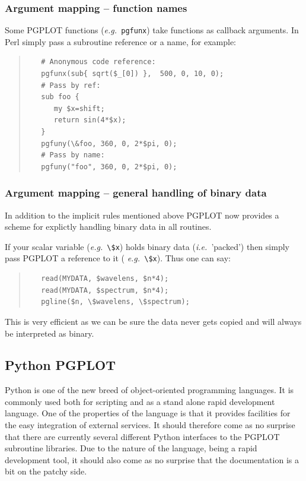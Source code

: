\documentclass[twoside,11pt]{article}
\newcommand{\htmladdnormallink}[2]{#1}
\newcommand{\xlabel}[1]{}
\begin{document}
\subsubsection{Argument mapping -- function names}

Some PGPLOT functions ({\em e.g.\ }{\tt pgfunx}) take functions as
callback arguments. In Perl simply pass a subroutine reference or a
name, for example:

\small
\begin{quote}
\begin{verbatim}
   # Anonymous code reference:
   pgfunx(sub{ sqrt($_[0]) },  500, 0, 10, 0);
   # Pass by ref:
   sub foo {
      my $x=shift;
      return sin(4*$x);
   }
   pgfuny(\&foo, 360, 0, 2*$pi, 0);
   # Pass by name:
   pgfuny("foo", 360, 0, 2*$pi, 0);
\end{verbatim}
\end{quote}
\normalsize

\subsubsection{Argument mapping -- general handling of binary data}

In addition to the implicit rules mentioned above PGPLOT now provides
a scheme for explictly handling binary data in all routines.

If your scalar variable ({\em e.g.\ }\verb+\$x+) holds binary data
({\em i.e.\ }'packed') then simply pass PGPLOT a reference to it ({\em
e.g.\ }\verb+\$x+). Thus one can say:

\small
\begin{quote}
\begin{verbatim}
   read(MYDATA, $wavelens, $n*4);
   read(MYDATA, $spectrum, $n*4);
   pgline($n, \$wavelens, \$spectrum);
\end{verbatim}
\end{quote}
\normalsize

This is very efficient as we can be sure the data never gets copied
and will always be interpreted as binary.

\subsection{\xlabel{sc15_pgpython}Python PGPLOT\label{sc15_pgpython}}

Python is one of the new breed of object-oriented programming
languages. It is commonly used both for scripting and as a stand alone
rapid development language. One of the properties of the language is
that it provides facilities for the easy integration of external
services. It should therefore come as no surprise that there are
currently
\htmladdnormallink{several}{http://www.geog.ubc.ca/~phil/ubc_python.html}
different Python interfaces to the PGPLOT subroutine libraries. Due to
the nature of the language, being a rapid development tool, it should
also come as no surprise that the documentation is a bit on the patchy
side.
\end{document}
